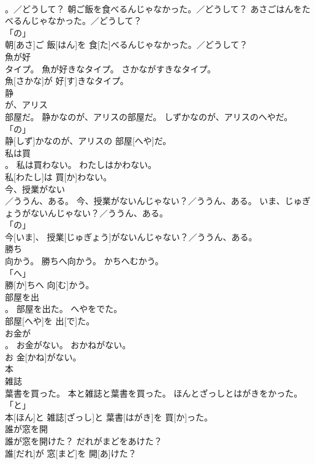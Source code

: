 \documentclass[8pt]{extreport}
\begin{document}
\begin{CJK}{UTF8}{min}
\\	。／どうして？	朝ご飯を食べるんじゃなかった。／どうして？	あさごはんをたべるんじゃなかった。／どうして？	
\\	「の」 
\\	朝[あさ]ご 飯[はん]を 食[た]べるんじゃなかった。／どうして？		
\\	魚が好
\\	タイプ。	魚が好きなタイプ。	さかながすきなタイプ。	
\\	魚[さかな]が 好[す]きなタイプ。		
\\	静
\\	が、アリス
\\	部屋だ。	静かなのが、アリスの部屋だ。	しずかなのが、アリスのへやだ。	
\\	「の」 
\\	静[しず]かなのが、アリスの 部屋[へや]だ。		
\\	私は買
\\	。	私は買わない。	わたしはかわない。	
\\	私[わたし]は 買[か]わない。		
\\	今、授業がない
\\	／ううん、ある。	今、授業がないんじゃない？／ううん、ある。	いま、じゅぎょうがないんじゃない？／ううん、ある。	
\\	「の」 
\\	今[いま]、 授業[じゅぎょう]がないんじゃない？／ううん、ある。		
\\	勝ち
\\	向かう。	勝ちへ向かう。	かちへむかう。	
\\	「へ」 
\\	勝[か]ちへ 向[む]かう。		
\\	部屋を出
\\	。	部屋を出た。	へやをでた。	
\\	部屋[へや]を 出[で]た。		
\\	お金が
\\	。	お金がない。	おかねがない。	
\\	お 金[かね]がない。		
\\	本
\\	雑誌
\\	葉書を買った。	本と雑誌と葉書を買った。	ほんとざっしとはがきをかった。	
\\	「と」 
\\	本[ほん]と 雑誌[ざっし]と 葉書[はがき]を 買[か]った。		
\\	誰が窓を開
\\	誰が窓を開けた？	だれがまどをあけた？	
\\	誰[だれ]が 窓[まど]を 開[あ]けた？		

\end{CJK}
\end{document}
